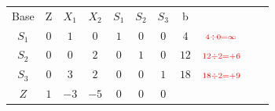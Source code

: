 \begin{frame}
{\begin{table}
\begin{tabular}{c c c c c c c c c c c}
			\end{tabular}
		\end{table}			
	}	
	{		
		\begin{table}		
			\begin{tabular}{c c c c c c c c c c c}
				\cline{1-8} 
				\cellcolor{blue!100} \color{white} \scriptsize Base 
				&\cellcolor{blue!100} \color{white} \scriptsize Z 
				&\cellcolor{blue!100} \color{white} $\scriptstyle X_1$ 
				&\cellcolor{blue!100} \color{white} $\scriptstyle X_2$ 
				&\cellcolor{blue!100} \color{red} $\scriptstyle S_1$ 
				&\cellcolor{blue!100} \color{red} $\scriptstyle S_2$ 
				&\cellcolor{blue!100} \color{red} $\scriptstyle S_3$ 
				&\cellcolor{blue!100} \color{white} \scriptsize b
				&
				&
				& \\
				\cline{1-8}
				\cellcolor{blue!100} \color{red} $\scriptstyle S_1$
				& \cellcolor{yellow!50} $\scriptstyle 0$
				& \cellcolor{yellow!50} $\scriptstyle 1$
				& \cellcolor{gray!50} $\scriptstyle 0$
				& \cellcolor{yellow!50} $\scriptstyle 1$
				& \cellcolor{yellow!50} $\scriptstyle 0$
				& \cellcolor{yellow!50} $\scriptstyle 0$
				& \cellcolor{gray!50} $\scriptstyle 4$
				& $ \scriptstyle \color{red} 4 \div 0 = \infty $
				&
				& \\
				\cline{1-8} 
				\cellcolor{blue!100} \color{red} $\scriptstyle S_2$
				& \cellcolor{yellow!50} $\scriptstyle 0$
				& \cellcolor{yellow!50} $\scriptstyle 0$
				& \cellcolor{gray!50} $\scriptstyle 2$
				& \cellcolor{yellow!50} $\scriptstyle 0$			
				& \cellcolor{yellow!50} $\scriptstyle 1$
				& \cellcolor{yellow!50} $\scriptstyle 0$
				& \cellcolor{gray!50} $\scriptstyle 12$
				& $ \scriptstyle \color{red} 12 \div 2 = +6 $
				&
				& \\
				\cline{1-8} 
				\cellcolor{blue!100} \color{red} $\scriptstyle S_3$
				& \cellcolor{yellow!50} $\scriptstyle 0$
				& \cellcolor{yellow!50} $\scriptstyle 3$
				& \cellcolor{gray!50} $\scriptstyle 2$
				& \cellcolor{yellow!50} $\scriptstyle 0$
				& \cellcolor{yellow!50} $\scriptstyle 0$
				& \cellcolor{yellow!50} $\scriptstyle 1$
				& \cellcolor{gray!50} $\scriptstyle 18$
				& $ \scriptstyle \color{red} 18 \div 2 = +9 $
				&
				& \\
				\cline{1-8}
				\cellcolor{blue!100} \color{white} $\scriptstyle Z$
				& \cellcolor{yellow!50} $\scriptstyle 1$
				& \cellcolor{yellow!50} $\scriptstyle -3$
				& \cellcolor{gray!50} $\scriptstyle -5$
				& \cellcolor{yellow!50} $\scriptstyle 0$
				& \cellcolor{yellow!50} $\scriptstyle 0$
				& \cellcolor{yellow!50} $\scriptstyle 0$

\end{tabular}
\end{table}}
\end{frame}
